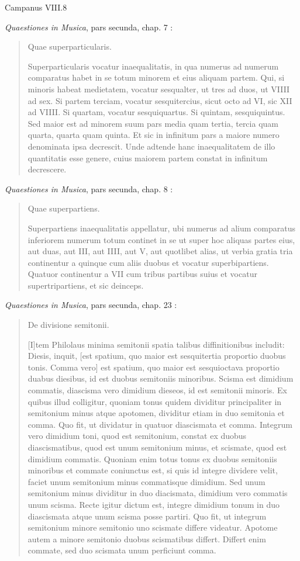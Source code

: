 \documentclass{amsart}
\theoremstyle{definition}
\begin{document}
Campanus VIII.8 \cite{campanusI}

{\em Quaestiones in Musica}, pars secunda, chap. 7 \cite[p.~77]{steglich}:

\begin{quote}
Quae superparticularis.

Superparticularis vocatur inaequalitatis, in qua numerus ad numerum
comparatus habet in se totum minorem et eius aliquam partem. Qui, si
minoris habeat medietatem, vocatur sesqualter, ut tres ad duos, ut VIIII
ad sex. Si partem terciam, vocatur sesquitercius, sicut octo ad VI, sic XII
ad VIIII. Si quartam, vocatur sesquiquartus. Si quintam, sesquiquintus.
Sed maior est ad minorem suum pars media quam tertia,
tercia quam quarta, quarta quam quinta. Et sic in infinitum pars a maiore
numero denominata ipsa decrescit. Unde adtende hanc inaequalitatem de
illo quantitatis esse genere, cuius maiorem partem constat in infinitum
decrescere.
\end{quote}

{\em Quaestiones in Musica}, pars secunda, chap. 8 \cite[p.~77]{steglich}:

\begin{quote}
Quae superpartiens.

Superpartiens inaequalitatis appellatur, ubi numerus ad alium comparatus
inferiorem numerum totum continet in se ut super hoc aliquas partes eius,
aut duas, aut III, aut IIII, aut V, aut quotlibet alias, ut verbia gratia tria
continentur a quinque cum aliis duobus et vocatur superbipartiens. Quatuor
continentur a VII cum tribus partibus suius et vocatur supertripartiens, et
sic deinceps. 
\end{quote}

{\em Quaestiones in Musica}, pars secunda, chap. 23 \cite[p.~89]{steglich}:

\begin{quote}
De divisione semitonii.

[I]tem Philolaus minima semitonii spatia talibus diffinitionibus includit:
Diesis, inquit, [est spatium, quo maior est sesquitertia proportio duobus
tonis. Comma vero] est spatium, quo maior est sesquioctava proportio
duabus diesibus, id est duobus semitoniis minoribus. Scisma est dimidium
commatis, diascisma vero dimidium dieseos, id est semitonii minoris.
Ex quibus illud colligitur, quoniam tonus quidem dividitur principaliter
in semitonium minus atque apotomen, dividitur etiam in duo semitonia
et comma. Quo fit, ut dividatur in quatuor diascismata et comma.
Integrum vero dimidium toni, quod est semitonium, constat ex duobus
diascismatibus, quod est unum semitonium minus, et scismate, quod est
dimidium commatis. Quoniam enim totus tonus ex duobus semitoniis
minoribus et commate coniunctus est, si quis id integre dividere velit,
faciet unum semitonium minus commatisque dimidium. Sed unum semitonium
minus dividitur in duo diacismata, dimidium vero commatis unum
scisma. Recte igitur dictum est, integre dimidium tonum in duo diascismata
atque unum scisma posse partiri. Quo fit, ut integrum semitonium
minore semitonio uno scismate differe videatur. Apotome autem
a minore semitonio duobus scismatibus differt. Differt enim commate,
sed duo scismata unum perficiunt comma.
\end{quote}
\end{document}
